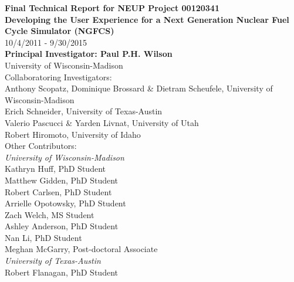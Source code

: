 
\begin{titlepage}
  \begin{center}
    {\Large\bfseries Final Technical Report for NEUP Project 00120341}\\[1cm]
    {\huge\bfseries Developing the User Experience for a Next Generation Nuclear Fuel Cycle Simulator (NGFCS)}\\[12pt]
    {\Large 10/4/2011 -	9/30/2015}\\
    
    \vspace{2cm}
    {\bfseries Principal Investigator: Paul P.H. Wilson}\\[5pt]
    University of Wisconsin-Madison\\

    \vspace{2cm}
    Collaboratoring Investigators:\\[5pt]
    Anthony Scopatz, Dominique Brossard \& Dietram Scheufele, University of Wisconsin-Madison\\
    Erich Schneider, University of Texas-Austin\\
    Valerio Pascucci \& Yarden Livnat, University of Utah\\
    Robert Hiromoto, University of Idaho\\

    \vspace{2cm}
    Other Contributors:\\[5pt]
    \textit{University of Wisconsin-Madison}\\
    Kathryn Huff, PhD Student\\
    Matthew Gidden, PhD Student\\
    Robert Carlsen, PhD Student\\
    Arrielle Opotowsky, PhD Student\\
    Zach Welch, MS Student\\
    Ashley Anderson, PhD Student\\
    Nan Li, PhD Student\\
    Meghan McGarry, Post-doctoral Associate\\[10pt]
    \textit{University of Texas-Austin}\\
    Robert Flanagan, PhD Student\\
    \vfill



    
  \end{center}
\end{titlepage}
